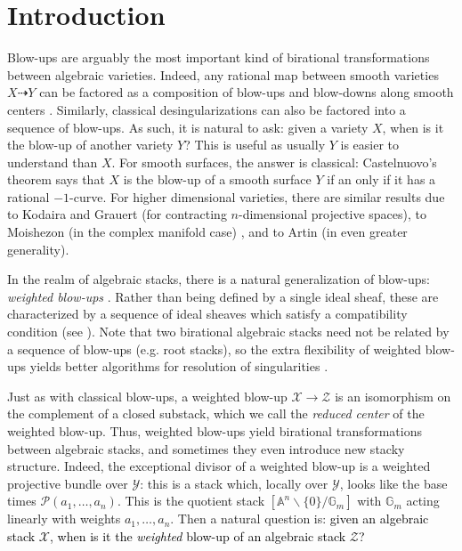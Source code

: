 \documentclass{amsart}
\newcommand{\bA}{\mathbb{A}}
\newcommand{\bG}{\mathbb{G}}
\newcommand{\cP}{\mathcal{P}}
\newcommand{\cX}{\mathcal{X}}
\newcommand{\cY}{\mathcal{Y}}
\newcommand{\cZ}{\mathcal{Z}}
\theoremstyle{definition}
\begin{document}
 \section{Introduction}
 Blow-ups are arguably the most important kind of birational transformations between algebraic varieties. Indeed, any rational map between smooth varieties $X\dashrightarrow Y$ can be factored as a composition of blow-ups and blow-downs along smooth centers \cite{abramovich_factor}. Similarly, classical desingularizations can also be factored into a sequence of blow-ups.
 As such, it is natural to ask: given a variety $X$, when is it the blow-up of another variety $Y$? This is useful as usually $Y$ is easier to understand than $X$. For smooth surfaces, the answer is classical: Castelnuovo's theorem says that $X$ is the blow-up of a smooth surface $Y$ if an only if it has a rational $-1$-curve. 
 For higher dimensional varieties, there are similar results due to Kodaira \cite{kodaira1954kahler} and Grauert \cite{grauert1962modifikationen} (for contracting $n$-dimensional projective spaces), to Moishezon \cite{moishezon1966n} (in the complex manifold case) , and to Artin \cite{artin1970algebraization} (in even greater generality).

 In the realm of algebraic stacks, there is a natural generalization of blow-ups: \textit{weighted blow-ups} \cites{abramovich2019functorial, QR}. Rather than being defined by a single ideal sheaf, these are characterized by a sequence of ideal sheaves which satisfy a compatibility condition (see ).
 Note that two birational algebraic stacks need not be related by a sequence of blow-ups (e.g. root stacks), so the extra flexibility of weighted blow-ups yields better algorithms for resolution of singularities \cite{abramovich2019functorial}.
 
 Just as with classical blow-ups, a weighted blow-up $\cX\to \cZ$ is an isomorphism on the complement of a closed substack, which we call the \textit{reduced center} of the weighted blow-up.
 Thus, weighted blow-ups yield birational transformations between algebraic stacks, and sometimes they even introduce new stacky structure.
 Indeed, the exceptional divisor of a weighted blow-up is a weighted projective bundle over $\cY$: this is a stack which, locally over $\cY$, looks like the base times $\cP(a_1,\ldots,a_n)$. This is the quotient stack $[\bA^{n}\smallsetminus\{0\}/\bG_m]$ with $\bG_m$ acting linearly with weights $a_1,\ldots, a_n$. 
 Then a natural question is: \textcolor{black}{given an algebraic stack $\cX$, when is it the \emph{weighted} blow-up of an algebraic stack $\cZ$?}
 
\end{document}
